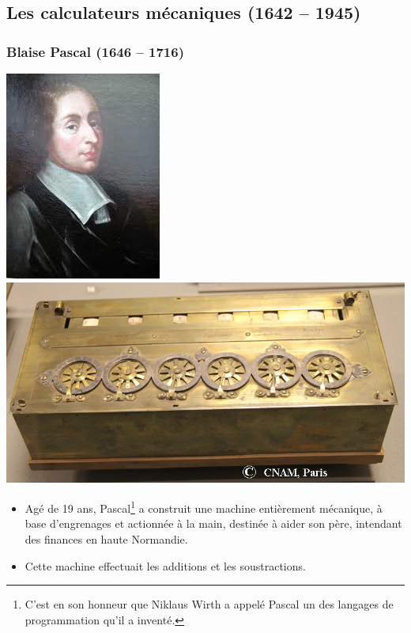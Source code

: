 \documentclass[utf8,10pt]{beamer}
\begin{document}
\subsection{Les calculateurs mécaniques (1642 -- 1945)}

\begin{frame}
    \frametitle{Blaise Pascal (1646 -- 1716)}
    \begin{center}
        \includegraphics[scale=0.4]{./images/pascal.png}
        \hfill
        \includegraphics[scale=0.25]{./images/pascaline.jpg}
    \end{center}
    
    \begin{itemize}
        \item Agé de 19 ans, Pascal\footnote{C'est en son honneur que Niklaus Wirth a appelé Pascal un des 
    langages de programmation qu'il a inventé.} a construit une machine entièrement mécanique, à 
    base d'engrenages et actionnée à la main, destinée à aider son père, intendant des finances
    en haute Normandie.
        \item Cette machine effectuait les additions et les soustractions.
    \end{itemize}
    
    \hfill \hyperlink{http://fr.wikipedia.org/wiki/Blaise_Pascal}{}
\end{frame}
\end{document}
